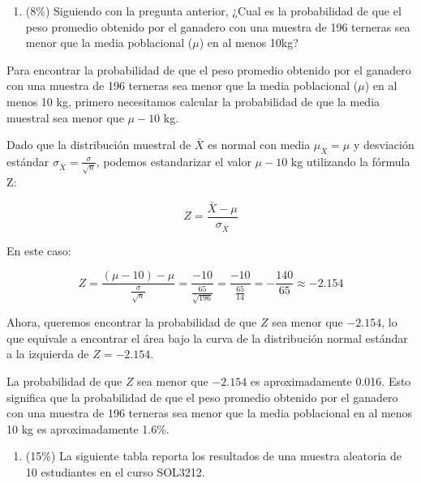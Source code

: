 \documentclass[
  letterpaper,
  DIV=11,
  numbers=noendperiod]{scrartcl}
\providecommand{\tightlist}{%
  \setlength{\itemsep}{0pt}\setlength{\parskip}{0pt}}\usepackage{longtable,booktabs,array}
\begin{document}
\begin{enumerate}
\def\labelenumi{\arabic{enumi}.}
\setcounter{enumi}{2}
\tightlist
\item
  (8\%) Siguiendo con la pregunta anterior, ¿Cual es la probabilidad de
  que el peso promedio obtenido por el ganadero con una muestra de 196
  terneras sea menor que la media poblacional (\(\mu\)) en al menos
  10kg?
\end{enumerate}

Para encontrar la probabilidad de que el peso promedio obtenido por el
ganadero con una muestra de 196 terneras sea menor que la media
poblacional (\(\mu\)) en al menos 10 kg, primero necesitamos calcular la
probabilidad de que la media muestral sea menor que \(\mu - 10\) kg.

Dado que la distribución muestral de \(\bar{X}\) es normal con media
\(\mu_{\bar{X}} = \mu\) y desviación estándar
\(\sigma_{\bar{X}} = \frac{\sigma}{\sqrt{n}}\), podemos estandarizar el
valor \(\mu - 10\) kg utilizando la fórmula Z:

\[Z = \frac{\bar{X} - \mu}{\sigma_{\bar{X}}}\]

En este caso:

\[Z = \frac{(\mu - 10) - \mu}{\frac{\sigma}{\sqrt{n}}} = \frac{-10}{\frac{65}{\sqrt{196}}} = \frac{-10}{\frac{65}{14}} = -\frac{140}{65} \approx -2.154\]

Ahora, queremos encontrar la probabilidad de que \(Z\) sea menor que
\(-2.154\), lo que equivale a encontrar el área bajo la curva de la
distribución normal estándar a la izquierda de \(Z = -2.154\).

La probabilidad de que \(Z\) sea menor que \(-2.154\) es aproximadamente
0.016. Esto significa que la probabilidad de que el peso promedio
obtenido por el ganadero con una muestra de 196 terneras sea menor que
la media poblacional en al menos 10 kg es aproximadamente 1.6\%.

\begin{enumerate}
\def\labelenumi{\arabic{enumi}.}
\setcounter{enumi}{3}
\tightlist
\item
  (15\%) La siguiente tabla reporta los resultados de una muestra
  aleatoria de 10 estudiantes en el curso SOL3212.
\end{enumerate}
\end{document}
